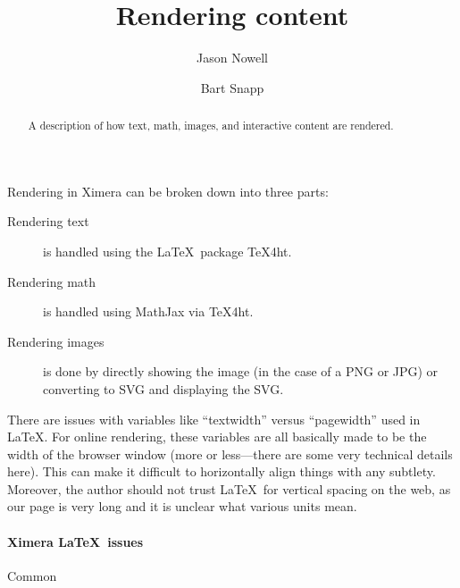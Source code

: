 \documentclass{ximera}
\title{Rendering content}
\author{Jason Nowell \and Bart Snapp}
\begin{document}
\begin{abstract}
    A description of how text, math, images, and interactive content are
    rendered.
\end{abstract}
\maketitle

Rendering in Ximera can be broken down into three parts:
\begin{description}
    \item[Rendering text] is handled using the \LaTeX\ package TeX4ht.
    \item[Rendering math] is handled using MathJax via TeX4ht.
    \item[Rendering images] is done by directly showing the image (in the case
        of a PNG or JPG) or converting to SVG and displaying the SVG.
\end{description}


There are issues with variables like ``textwidth'' versus
``pagewidth'' used in \LaTeX. For online rendering, these variables are all
basically made to be the width of the browser window (more or less---there are
some very technical details here). This can make it difficult to horizontally
align things with any subtlety. Moreover, the author should not trust \LaTeX\ for vertical spacing on the web, as our page is very long and it is unclear what various units mean.



\paragraph{Ximera \LaTeX\ issues}


Common



\begin{onlyHtml} %
\end{onlyHtml}

\begin{onlyPDF} %
\end{onlyPDF}
\end{document}
